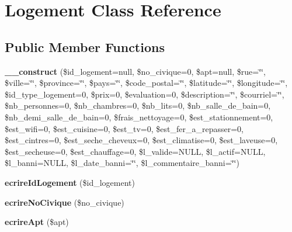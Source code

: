 \hypertarget{class_logement}{}\section{Logement Class Reference}
\label{class_logement}
\subsection*{Public Member Functions}
\begin{DoxyCompactItemize}
\item 
\mbox{\label{class_logement_a6f304e3e115da2664efa466aa5419a84}} 
{\bfseries \+\_\+\+\_\+construct} (\$id\+\_\+logement=null, \$no\+\_\+civique=0, \$apt=null, \$rue=\char`\"{}\char`\"{}, \$ville=\char`\"{}\char`\"{}, \$province=\char`\"{}\char`\"{}, \$pays=\char`\"{}\char`\"{}, \$code\+\_\+postal=\char`\"{}\char`\"{}, \$latitude=\char`\"{}\char`\"{}, \$longitude=\char`\"{}\char`\"{}, \$id\+\_\+type\+\_\+logement=0, \$prix=0, \$evaluation=0, \$description=\char`\"{}\char`\"{}, \$courriel=\char`\"{}\char`\"{}, \$nb\+\_\+personnes=0, \$nb\+\_\+chambres=0, \$nb\+\_\+lits=0, \$nb\+\_\+salle\+\_\+de\+\_\+bain=0, \$nb\+\_\+demi\+\_\+salle\+\_\+de\+\_\+bain=0, \$frais\+\_\+nettoyage=0, \$est\+\_\+stationnement=0, \$est\+\_\+wifi=0, \$est\+\_\+cuisine=0, \$est\+\_\+tv=0, \$est\+\_\+fer\+\_\+a\+\_\+repasser=0, \$est\+\_\+cintres=0, \$est\+\_\+seche\+\_\+cheveux=0, \$est\+\_\+climatise=0, \$est\+\_\+laveuse=0, \$est\+\_\+secheuse=0, \$est\+\_\+chauffage=0, \$l\+\_\+valide=N\+U\+LL, \$l\+\_\+actif=N\+U\+LL, \$l\+\_\+banni=N\+U\+LL, \$l\+\_\+date\+\_\+banni=\char`\"{}\char`\"{}, \$l\+\_\+commentaire\+\_\+banni=\char`\"{}\char`\"{})
\item 
\mbox{\label{class_logement_a7243710a2847e48958f4ef984448f606}} 
{\bfseries ecrire\+Id\+Logement} (\$id\+\_\+logement)
\item 
\mbox{\label{class_logement_a8663e1753c1f5b6918d72ed9b24e4c9a}} 
{\bfseries ecrire\+No\+Civique} (\$no\+\_\+civique)
\item 
\mbox{\label{class_logement_a94bab09e40e30f7abad6db28a303a314}} 
{\bfseries ecrire\+Apt} (\$apt)
\item 
\mbox{\label{class_logement_a2e0301fe48d58822ca8e1695974bd9a9}} 

\end{DoxyCompactItemize}
